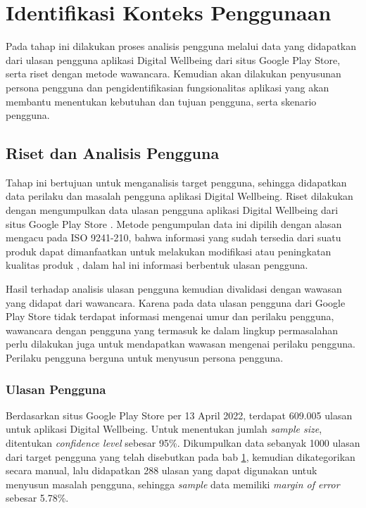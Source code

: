\section{Identifikasi Konteks Penggunaan}
\label{sec:identifikasi_konteks_penggunaan}

Pada tahap ini dilakukan proses analisis pengguna melalui data yang didapatkan dari ulasan pengguna aplikasi Digital Wellbeing dari situs Google Play Store, serta riset dengan metode wawancara. Kemudian akan dilakukan penyusunan persona pengguna dan pengidentifikasian fungsionalitas aplikasi yang akan membantu menentukan kebutuhan dan tujuan pengguna, serta skenario pengguna.

\subsection{Riset dan Analisis Pengguna}
\label{subsec:riset_analisis}

Tahap ini bertujuan untuk menganalisis target pengguna, sehingga didapatkan data perilaku dan masalah pengguna aplikasi Digital Wellbeing. Riset dilakukan dengan mengumpulkan data ulasan pengguna aplikasi Digital Wellbeing dari situs Google Play Store \textcite{dwplaystorereviews}. Metode pengumpulan data ini dipilih dengan alasan mengacu pada ISO 9241-210, bahwa informasi yang sudah tersedia dari suatu produk dapat dimanfaatkan untuk melakukan modifikasi atau peningkatan kualitas produk \parencite{iso9241-210:2010}, dalam hal ini informasi berbentuk ulasan pengguna.

Hasil terhadap analisis ulasan pengguna kemudian divalidasi dengan wawasan yang didapat dari wawancara. Karena pada data ulasan pengguna dari Google Play Store tidak terdapat informasi mengenai umur dan perilaku pengguna, wawancara dengan pengguna yang termasuk ke dalam lingkup permasalahan perlu dilakukan juga untuk mendapatkan wawasan mengenai perilaku pengguna. Perilaku pengguna berguna untuk menyusun persona pengguna.

\subsubsection{Ulasan Pengguna}
\label{subsubsec:ulasan_pengguna}

Berdasarkan situs Google Play Store per 13 April 2022, terdapat 609.005 ulasan untuk aplikasi Digital Wellbeing. Untuk menentukan jumlah \textit{sample size}, ditentukan \textit{confidence level} sebesar 95\%. Dikumpulkan data sebanyak 1000 ulasan dari target pengguna yang telah disebutkan pada bab \ref{sec:identifikasi_konteks_penggunaan},  kemudian dikategorikan secara manual, lalu didapatkan 288 ulasan yang dapat digunakan untuk menyusun masalah pengguna, sehingga \textit{sample} data memiliki \textit{margin of error} sebesar 5.78\%.

